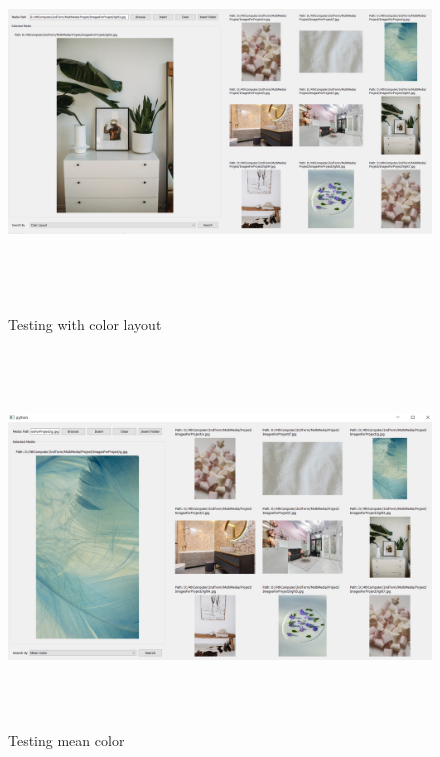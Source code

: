   \begin{figure}[H]
    \centering
    \includegraphics[width=120mm,height=100mm]{Images/4.png}
    \caption{Testing with color layout}
  \end{figure}

  \begin{figure}[H]
    \centering
    \includegraphics[width=120mm,height=100mm]{Images/5.png}
    \caption{Testing mean color}
  \end{figure}
